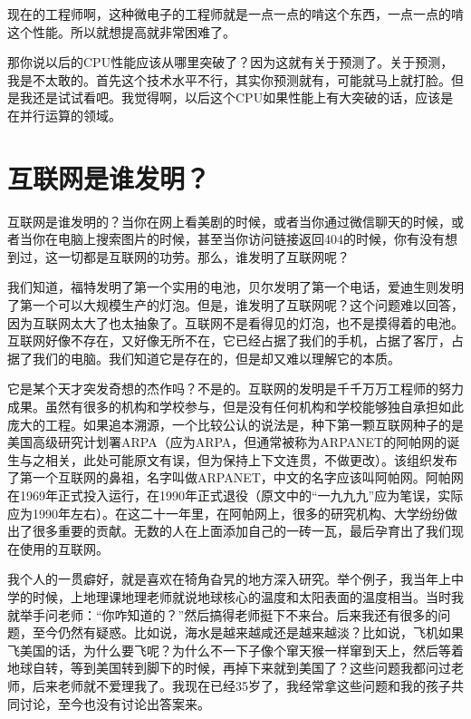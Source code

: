 \documentclass[
  letterpaper,
  DIV=11,
  numbers=noendperiod]{scrreprt}
\begin{document}
现在的工程师啊，这种微电子的工程师就是一点一点的啃这个东西，一点一点的啃这个性能。所以就想提高就非常困难了。

那你说以后的CPU性能应该从哪里突破了？因为这就有关于预测了。关于预测，我是不太敢的。首先这个技术水平不行，其实你预测就有，可能就马上就打脸。但是我还是试试看吧。我觉得啊，以后这个CPU如果性能上有大突破的话，应该是在并行运算的领域。


\chapter{互联网是谁发明？}\label{ux4e92ux8054ux7f51ux662fux8c01ux53d1ux660e}

互联网是谁发明的？当你在网上看美剧的时候，或者当你通过微信聊天的时候，或者当你在电脑上搜索图片的时候，甚至当你访问链接返回404的时候，你有没有想到过，这一切都是互联网的功劳。那么，谁发明了互联网呢？

我们知道，福特发明了第一个实用的电池，贝尔发明了第一个电话，爱迪生则发明了第一个可以大规模生产的灯泡。但是，谁发明了互联网呢？这个问题难以回答，因为互联网太大了也太抽象了。互联网不是看得见的灯泡，也不是摸得着的电池。互联网好像不存在，又好像无所不在，它已经占据了我们的手机，占据了客厅，占据了我们的电脑。我们知道它是存在的，但是却又难以理解它的本质。

它是某个天才突发奇想的杰作吗？不是的。互联网的发明是千千万万工程师的努力成果。虽然有很多的机构和学校参与，但是没有任何机构和学校能够独自承担如此庞大的工程。如果追本溯源，一个比较公认的说法是，种下第一颗互联网种子的是美国高级研究计划署ARPA（应为ARPA，但通常被称为ARPANET的阿帕网的诞生与之相关，此处可能原文有误，但为保持上下文连贯，不做更改）。该组织发布了第一个互联网的鼻祖，名字叫做ARPANET，中文的名字应该叫阿帕网。阿帕网在1969年正式投入运行，在1990年正式退役（原文中的``一九九九''应为笔误，实际应为1990年左右）。在这二十一年里，在阿帕网上，很多的研究机构、大学纷纷做出了很多重要的贡献。无数的人在上面添加自己的一砖一瓦，最后孕育出了我们现在使用的互联网。

我个人的一贯癖好，就是喜欢在犄角旮旯的地方深入研究。举个例子，我当年上中学的时候，上地理课地理老师就说地球核心的温度和太阳表面的温度相当。当时我就举手问老师：``你咋知道的？''然后搞得老师挺下不来台。后来我还有很多的问题，至今仍然有疑惑。比如说，海水是越来越咸还是越来越淡？比如说，飞机如果飞美国的话，为什么要飞呢？为什么不一下子像个窜天猴一样窜到天上，然后等着地球自转，等到美国转到脚下的时候，再掉下来就到美国了？这些问题我都问过老师，后来老师就不爱理我了。我现在已经35岁了，我经常拿这些问题和我的孩子共同讨论，至今也没有讨论出答案来。
\end{document}

